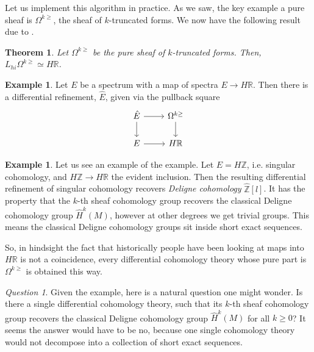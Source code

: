 \documentclass[10pt]{amsart}
\newcommand{\bR}{\mathbb{R}}
\newcommand{\bZ}{\mathbb{Z}}
\newtheorem{theorem}[equation]{Theorem}
\theoremstyle{definition}
\newtheorem{example}[equation]{Example}
\theoremstyle{remark}
\newtheorem{question}[section]{Question}
\numberwithin{equation}{section}
\begin{document}
Let us implement this algorithm in practice. As we saw, the key example a pure sheaf is $\Omega^{k \geq}$, the sheaf of $k$-truncated forms. We now have the following result due to \cite{bunkenikolausvoelkl2016diffcoh}.

\begin{theorem}
  Let $\Omega^{k \geq}$ be the pure sheaf of $k$-truncated forms. Then, $L_{hi}\Omega^{k \geq} \simeq H\bR$. 
\end{theorem}

\begin{example}
 Let $E$ be a spectrum with a map of spectra $E \to H\bR$. Then there is a differential refinement, $\hat{E}$, given via the pullback square 
 \[ 
 \begin{tikzcd}
 \hat{E} \arrow{r} \arrow{d} & \Omega^{k \geq}  \arrow{d} \\
 E \arrow{r} & H\bR
 \end{tikzcd}
 \]
\end{example}

\begin{example}
 Let us see an example of the example. Let $E = H\bZ$, i.e. singular cohomology, and $H\bZ \to H\bR$ the evident inclusion. Then the resulting differential refinement of singular cohomology recovers \emph{Deligne cohomology} $\hat{\bZ}[l]$. It has the property that the $k$-th sheaf cohomology group recovers the classical Deligne cohomology group $\hat{H}^k(M)$, however at other degrees we get trivial groups. This means the classical Deligne cohomology groups sit inside short exact sequences.
\end{example}

So, in hindsight the fact that historically people have been looking at maps into $H\bR$ is not a coincidence, every differential cohomology theory whose pure part is $\Omega^{k \geq}$ is obtained this way.

\begin{question} \label{que:deligne}
 Given the example, here is a natural question one might wonder. Is there a single differential cohomology theory, such that its $k$-th sheaf cohomology group recovers the classical Deligne cohomology group $\hat{H}^k(M)$ for all $k \geq 0$? It seems the answer would have to be no, because one single cohomology theory would not decompose into a collection of short exact sequences.
\end{question}
\end{document}
